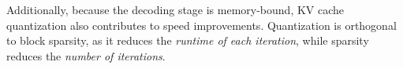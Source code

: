 

Additionally, because the decoding stage is memory-bound, KV cache quantization also contributes to speed improvements. Quantization is orthogonal to block sparsity, as it reduces the \textit{runtime of each iteration}, while sparsity reduces the \textit{number of iterations}. %

















